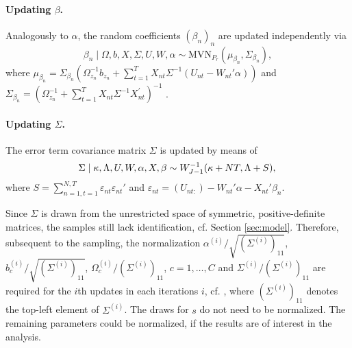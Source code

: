 \documentclass[article]{jss}
\newcommand{\eps}{\varepsilon}
\newcommand{\MVN}[1]{\text{MVN}_{#1}}
\begin{document}
\paragraph{Updating $\beta$.} Analogously to $\alpha$, the random coefficients $(\beta_n)_n$ are updated independently via
\begin{equation}
\beta_n \mid \Omega,b,X,\Sigma,U,W,\alpha \sim \MVN{P_r}(\mu_{\beta_n},\Sigma_{\beta_n}),
\end{equation}
where $\mu_{\beta_n} = \Sigma_{\beta_n} (\Omega_{z_n}^{-1}b_{z_n} + \sum_{t=1}^{T} X_{nt} \Sigma^{-1} (U_{nt}-W_{nt}'\alpha) )$ and $\Sigma_{\beta_n} = (\Omega_{z_n}^{-1} + \sum_{t=1}^{T} X_{nt}\Sigma^{-1} X_{nt}^{'} )^{-1}$ .

\paragraph{Updating $\Sigma$.}
The error term covariance matrix $\Sigma$ is updated by means of
\begin{equation}
\Sigma \mid \kappa,\Lambda,U,W,\alpha,X,\beta \sim W^{-1}_{J-1}(\kappa+NT,\Lambda+S), \\
\end{equation}
where $S = \sum_{n=1,t=1}^{N,T} \eps_{nt} \eps_{nt}'$ and $\eps_{nt} = (U_{nt:}) - W_{nt}'\alpha - X_{nt}'\beta_n$.

Since $\Sigma$ is drawn from the unrestricted space of symmetric, positive-definite matrices, the samples still lack identification, cf. Section \ref{sec:model}. Therefore, subsequent to the sampling, the normalization $\alpha^{(i)}/\sqrt{(\Sigma^{(i)})_{11}}$, $b_c^{(i)}/\sqrt{(\Sigma^{(i)})_{11}}$, $\Omega_c^{(i)}/(\Sigma^{(i)})_{11}$, $c=1,\dots,C$ and $\Sigma^{(i)}/(\Sigma^{(i)})_{11}$ are required for the $i$th updates in each iterations $i$, cf. \cite{Imai:05}, where $(\Sigma^{(i)})_{11}$ denotes the top-left element of $\Sigma^{(i)}$. The draws for $s$ do not need to be normalized. The remaining parameters could be normalized, if the results are of interest in the analysis.
\end{document}
